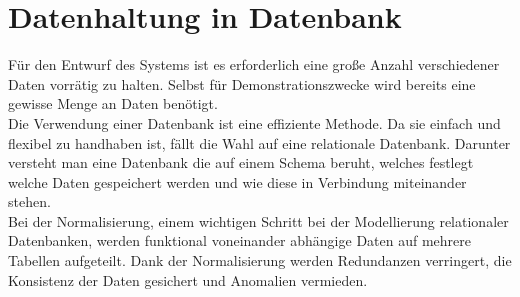\section{Datenhaltung in Datenbank}
Für den Entwurf des Systems ist es erforderlich eine große Anzahl verschiedener Daten vorrätig zu halten. Selbst für Demonstrationszwecke wird bereits eine gewisse Menge an Daten benötigt.\\
Die Verwendung einer Datenbank ist eine effiziente Methode. Da sie einfach und flexibel zu handhaben ist, fällt die Wahl auf eine relationale Datenbank. Darunter versteht man eine Datenbank die auf einem Schema beruht, welches festlegt welche Daten gespeichert werden und wie diese in Verbindung miteinander stehen.\\
Bei der Normalisierung, einem wichtigen Schritt bei der Modellierung relationaler Datenbanken, werden funktional voneinander abhängige Daten auf mehrere Tabellen aufgeteilt. Dank der Normalisierung werden Redundanzen verringert, die Konsistenz der Daten gesichert und Anomalien vermieden.

